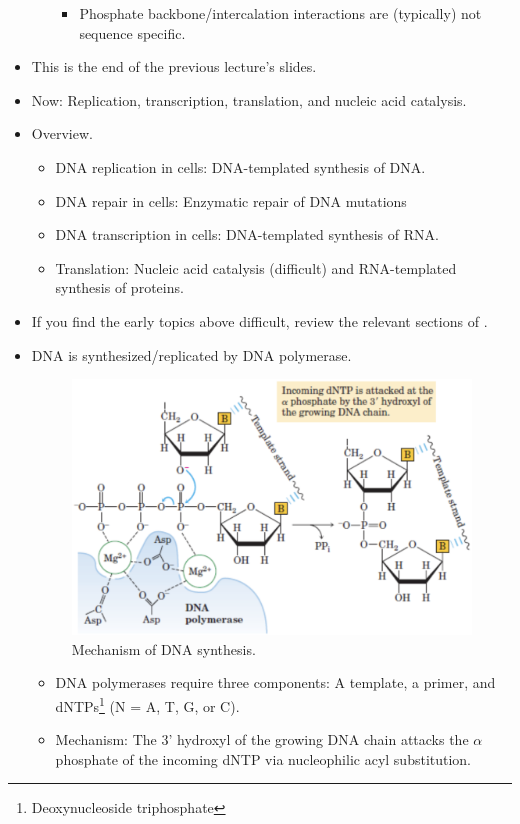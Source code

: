 \documentclass[../notes.tex]{subfiles}
\begin{document}
\begin{itemize}
\begin{itemize}
\begin{itemize}
            \item Phosphate backbone/intercalation interactions are (typically) not sequence specific.
        \end{itemize}
    \end{itemize}
    \item This is the end of the previous lecture's slides.
    \item Now: Replication, transcription, translation, and nucleic acid catalysis.
    \item Overview.
    \begin{itemize}
        \item DNA replication in cells: DNA-templated synthesis of DNA.
        \item DNA repair in cells: Enzymatic repair of DNA mutations
        \item DNA transcription in cells: DNA-templated synthesis of RNA.
        \item Translation: Nucleic acid catalysis (difficult) and RNA-templated synthesis of proteins.
    \end{itemize}
    \item If you find the early topics above difficult, review the relevant sections of \textcite{bib:Lehninger}.
    \item DNA is synthesized/replicated by DNA polymerase.
    \begin{figure}[h!]
        \centering
        \includegraphics[width=0.6\linewidth]{../ExtFiles/DNASynMech.png}
        \caption{Mechanism of DNA synthesis.}
        \label{fig:DNASynMech}
    \end{figure}
    \begin{itemize}
        \item DNA polymerases require three components: A template, a primer, and dNTPs\footnote{Deoxynucleoside triphosphate} (N = A, T, G, or C).
        \item Mechanism: The 3' hydroxyl of the growing DNA chain attacks the $\alpha$ phosphate of the incoming dNTP via nucleophilic acyl substitution.

\end{itemize}
\end{itemize}
\end{document}
